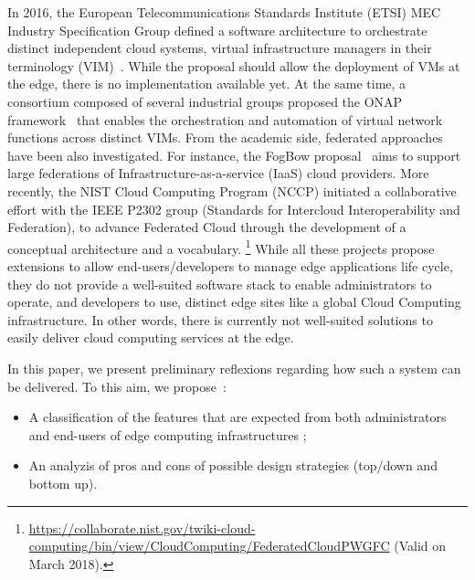 In 2016, the European Telecommunications Standards Institute (ETSI) MEC
Industry Specification Group defined  a software architecture
to orchestrate distinct independent cloud systems, \aka virtual
infrastructure managers in their terminology
(VIM)~\cite{7574435}. While the proposal should allow the deployment
of VMs at the edge, there is no implementation available yet.  At the
same time, a consortium composed of several industrial groups proposed
the ONAP framework~\cite{onap} that enables the orchestration and
automation of virtual network functions across distinct VIMs.  From
the academic side, federated approaches have been also investigated.
For instance, the FogBow proposal~\cite{brasileiro2016fogbow} aims to
support large federations of Infrastructure-as-a-service (IaaS) cloud
providers. More recently, the NIST Cloud Computing Program (NCCP)
initiated a collaborative effort with the IEEE P2302 group (Standards for Intercloud Interoperability and
Federation), to advance Federated Cloud through the development
of a conceptual architecture and a vocabulary.
\footnote{\url{https://collaborate.nist.gov/twiki-cloud-computing/bin/view/CloudComputing/FederatedCloudPWGFC} (Valid on March 2018).}
%
While all these projects propose extensions to %
allow end-users/developers to manage edge applications life cycle,
they do not provide a well-suited software stack to enable
administrators to operate, and developers to use, distinct edge sites
like a global Cloud Computing infrastructure. In other words, there is
currently not well-suited solutions to easily deliver cloud computing
services at the edge.
%
%

In this paper, we present preliminary reflexions regarding how such a
system can be delivered. To this aim, we propose~:
\begin{itemize}
\item A classification of the features that are expected from both
  administrators and end-users of edge computing infrastructures
  ; %
\item An analyzis of pros and cons of possible design strategies
  (top/down and bottom up).
\end{itemize}

